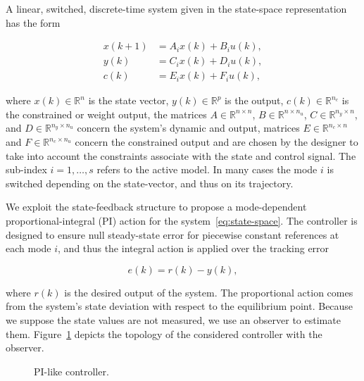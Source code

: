 A linear, switched, discrete-time system given in the state-space representation
has the form

\begin{equation}
	\label{eq:state-space}
	\begin{aligned}
		x(k+1) & = A_{i}x(k)+B_{i}u(k), \\
		y(k)   & = C_{i}x(k)+D_{i}u(k), \\
		c(k)   & = E_{i}x(k)+F_{i}u(k),
	\end{aligned}
\end{equation}

where \(x(k)\in\mathbb{R}^n\) is the state vector, \(y(k)\in\mathbb{R}^p\) is the
output, \(c(k)\in\mathbb{R}^{n_c}\) is the constrained or weight output, the
matrices \(A\in\mathbb{R}^{n\times{}n}\), \(B\in\mathbb{R}^{n\times{}n_u}\),
\(C\in\mathbb{R}^{n_y\times{}n}\), and \(D\in\mathbb{R}^{n_y\times{}n_u}\) concern the
system's dynamic and output, matrices \(E\in\mathbb{R}^{n_c\times{}n}\) and
\(F\in\mathbb{R}^{n_c\times{}n_u}\) concern the constrained output and are chosen by
the designer to take into account the constraints associate with the state and
control signal. The sub-index \(i = 1,\ldots, s\) refers to the active model. In many
cases the mode \(i\) is switched depending on the state-vector, and thus on its
trajectory.

We exploit the state-feedback structure to propose a mode-dependent
proportional-integral (PI) action for the system~\eqref{eq:state-space}. The
controller is designed to ensure null steady-state error for piecewise constant
references at each mode \(i\), and thus the integral action is applied over the
tracking error~\parencite{lopes.leite.ea:anti-windup}

\begin{equation}
	\label{eq:r-y-error}
	e(k) = r(k)-y(k),
\end{equation}

where \(r(k)\) is the desired output of the system. The proportional action
comes from the system's state deviation with respect to the equilibrium point.
Because we suppose the state values are not measured, we use an observer to
estimate them. Figure~\ref{fig:pi-controller-diagram} depicts the topology of
the considered controller with the observer.

\begin{figure}[!htb]
	\centering
	\resizebox{0.98\linewidth}{!}{}
	\caption{PI-like controller.}%
	\label{fig:pi-controller-diagram}
\end{figure}

